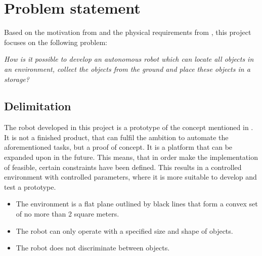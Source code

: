 \section{Problem statement} \label{sec:problem_statement}
Based on the motivation from  and the physical requirements from , this project focuses on the following problem:

\begin{center}
\textit{How is it possible to develop an autonomous robot which can locate all objects in an environment, collect the objects from the ground and place these objects in a storage?}
\end{center}

\subsection{Delimitation} \label{sec:delimitation}
The robot developed in this project is a prototype of the concept mentioned in . It is not a finished product, that can fulfil the ambition to automate the aforementioned tasks, but a proof of concept. It is a platform that can be expanded upon in the future. This means, that in order make the implementation of \projname{} feasible, certain constraints have been defined. This results in a controlled environment with controlled parameters, where it is more suitable to develop and test a prototype.

\begin{itemize}
\item The environment is a flat plane outlined by black lines that form a convex set of no more than 2 square meters.
\item The robot can only operate with a specified size and shape of objects.
\item The robot does not discriminate between objects.
\end{itemize}


